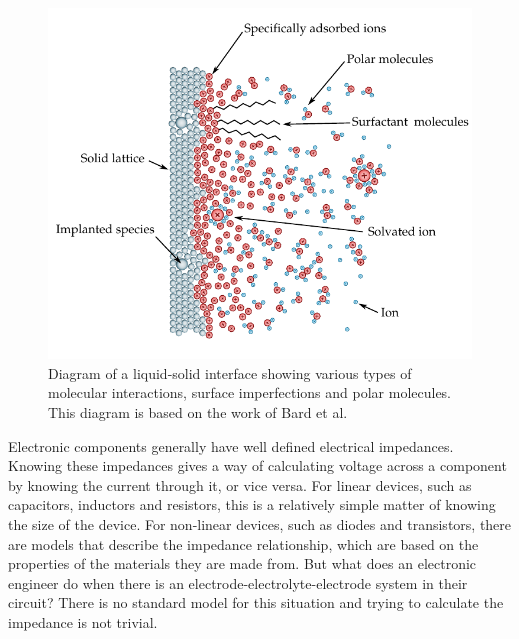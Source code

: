   \begin{figure}
    \begin{center}
      \includegraphics{content/introduction/graphics/interface}
    \end{center}
    \caption[Diagram of a liquid-solid interface showing various types of molecular interactions.]{Diagram of a liquid-solid interface showing various types of molecular interactions, surface imperfections and polar molecules. This diagram is based on the work of Bard et al. \cite{Bard1993}}
    \label{fig:interface}
  \end{figure}

  Electronic components generally have well defined electrical impedances.
  Knowing these impedances gives a way of calculating voltage across a component by knowing the current through it, or vice versa.
  For linear devices, such as capacitors, inductors and resistors, this is a relatively simple matter of knowing the size of the device.
  For non-linear devices, such as diodes and transistors, there are models that describe the impedance relationship, which are based on the properties of the materials they are made from.
  But what does an electronic engineer do when there is an electrode-electrolyte-electrode system in their circuit?
  There is no standard model for this situation and trying to calculate the impedance is not trivial.

